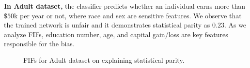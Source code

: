 \textbf{In Adult dataset,} the classifier predicts whether an individual earns more than $ \$50 $k per year or not, where race and sex are sensitive features. We observe that the trained network is unfair and it demonstrates statistical parity as $ 0.23 $. As we analyze FIFs,  education number, age, and capital gain/loss are key features responsible for the bias. 

\begin{figure}
	\begin{minipage}{0.45\textwidth}
		\centering
	\end{minipage}
	\begin{minipage}{0.5\textwidth}
		\centering
	\end{minipage}
	\caption[FIFs for Adult dataset]{FIFs for Adult dataset on explaining statistical parity.}\label{fairness_fairXplainer_fig:individual_vs_intersectional_influence_adult}
\end{figure}



